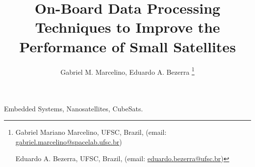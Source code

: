 \documentclass[journal]{IEEEtran}
\title{On-Board Data Processing Techniques to Improve the Performance of Small Satellites}
\author{Gabriel M. Marcelino, Eduardo A. Bezerra
	\thanks{
	Gabriel Mariano Marcelino, UFSC, Brazil, (email: \href{mailto:gabriel.marcelino@spacelab.ufsc.br}{gabriel.marcelino@spacelab.ufsc.br})

	Eduardo A. Bezerra, UFSC, Brazil, (email: \href{mailto:eduardo.bezerra@ufsc.br}{eduardo.bezerra@ufsc.br})
	}}
\date{}
\begin{document}
    \maketitle

    \begin{abstract}
    \end{abstract}

    \begin{IEEEkeywords}
        Embedded Systems, Nanosatellites, CubeSats.
    \end{IEEEkeywords}

    
    
    
    
    
    
    
    
\end{document}
